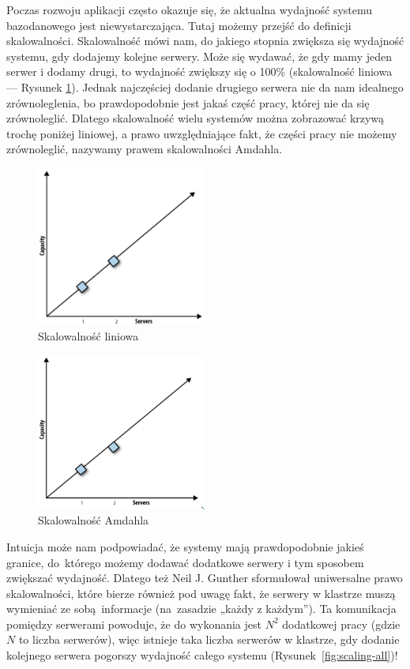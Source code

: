\documentclass[a4paper,12pt]{article}
\begin{document}
Poczas rozwoju aplikacji często okazuje się, że aktualna wydajność systemu bazodanowego jest niewystarczająca. Tutaj możemy przejść do definicji skalowalności. Skalowalność mówi nam, do jakiego stopnia zwiększa się wydajność systemu, gdy dodajemy kolejne serwery. Może się wydawać, że gdy mamy jeden serwer i dodamy drugi, to wydajność zwiększy się o 100\% (skalowalność liniowa --- Rysunek  \ref{fig:scaling-linear}). Jednak najczęściej dodanie drugiego serwera nie da nam idealnego zrównoleglenia, bo prawdopodobnie jest jakaś część pracy, której nie da się zrównoleglić. Dlatego skalowalność wielu systemów można zobrazować krzywą trochę poniżej liniowej, a prawo uwzględniające fakt, że części pracy nie możemy zrównoleglić, nazywamy prawem skalowalności Amdahla.

\begin{figure}[ht]
\centering
\includegraphics[width=0.5\textwidth]{scaling-linear.png}
\caption{Skalowalność liniowa}
\label{fig:scaling-linear}
\end{figure}

\begin{figure}[ht]
\centering
\includegraphics[width=0.5\textwidth]{scaling-almost-linear.png}
\caption{Skalowalność Amdahla}
\label{fig:scaling-almost-linear}
\end{figure}

Intuicja może nam podpowiadać, że systemy mają prawdopodobnie jakieś granice, do~którego możemy dodawać dodatkowe serwery i  tym sposobem zwiększać wydajność. Dlatego też Neil J. Gunther sformułował uniwersalne prawo skalowalności, które bierze również pod uwagę fakt, że serwery w klastrze muszą wymieniać ze sobą informacje (na~zasadzie „każdy z każdym”). Ta komunikacja pomiędzy serwerami powoduje, że do wykonania jest $N^2$ dodatkowej pracy (gdzie $N$ to liczba serwerów), więc istnieje taka liczba serwerów w klastrze, gdy dodanie kolejnego serwera pogorszy wydajność całego systemu (Rysunek~\ref{fig:scaling-all})!
\end{document}
